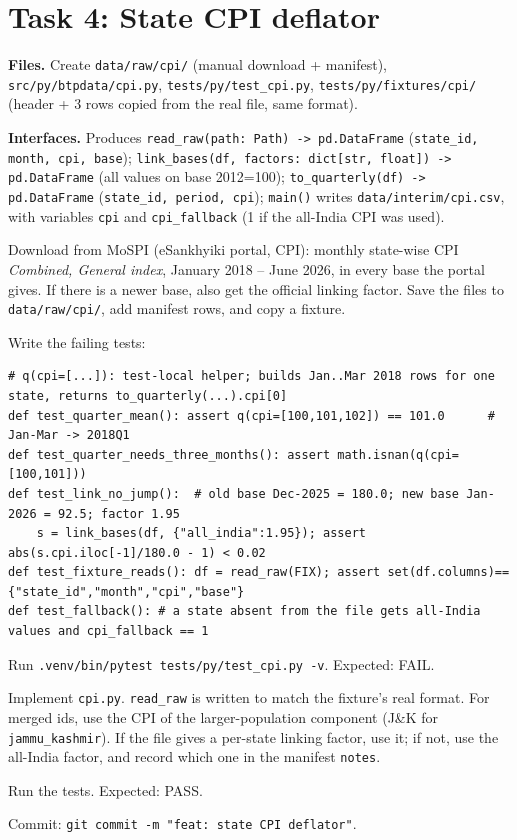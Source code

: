 \documentclass[10pt,a4paper]{article}
\newcommand{\f}[1]{\texttt{#1}}
\begin{document}
\section{Task 4: State CPI deflator}
\textbf{Files.} Create \f{data/raw/cpi/} (manual download + manifest), \f{src/py/btpdata/cpi.py},
\f{tests/py/test\_cpi.py}, \f{tests/py/fixtures/cpi/} (header + 3 rows copied from the real file, same format).

\textbf{Interfaces.} Produces \f{read\_raw(path: Path) -> pd.DataFrame} (\f{state\_id, month, cpi, base});
\f{link\_bases(df, factors: dict[str, float]) -> pd.DataFrame} (all values on base 2012=100);
\f{to\_quarterly(df) -> pd.DataFrame} (\f{state\_id, period, cpi}); \f{main()} writes \f{data/interim/cpi.csv},
with variables \f{cpi} and \f{cpi\_fallback} (1 if the all-India CPI was used).

\begin{steps}
\item Download from MoSPI (eSankhyiki portal, CPI): monthly state-wise CPI \emph{Combined, General index},
      January 2018 -- June 2026, in every base the portal gives. If there is a newer base, also get the official
      linking factor. Save the files to \f{data/raw/cpi/}, add manifest rows, and copy a fixture.
\item Write the failing tests:
\begin{verbatim}
# q(cpi=[...]): test-local helper; builds Jan..Mar 2018 rows for one state, returns to_quarterly(...).cpi[0]
def test_quarter_mean(): assert q(cpi=[100,101,102]) == 101.0      # Jan-Mar -> 2018Q1
def test_quarter_needs_three_months(): assert math.isnan(q(cpi=[100,101]))
def test_link_no_jump():  # old base Dec-2025 = 180.0; new base Jan-2026 = 92.5; factor 1.95
    s = link_bases(df, {"all_india":1.95}); assert abs(s.cpi.iloc[-1]/180.0 - 1) < 0.02
def test_fixture_reads(): df = read_raw(FIX); assert set(df.columns)=={"state_id","month","cpi","base"}
def test_fallback(): # a state absent from the file gets all-India values and cpi_fallback == 1
\end{verbatim}
\item Run \f{.venv/bin/pytest tests/py/test\_cpi.py -v}. Expected: FAIL.
\item Implement \f{cpi.py}. \f{read\_raw} is written to match the fixture's real format. For merged ids, use the
      CPI of the larger-population component (J\&K for \f{jammu\_kashmir}). If the file gives a per-state linking
      factor, use it; if not, use the all-India factor, and record which one in the manifest \f{notes}.
\item Run the tests. Expected: PASS.
\item Commit: \f{git commit -m "feat: state CPI deflator"}.
\end{steps}
\end{document}
